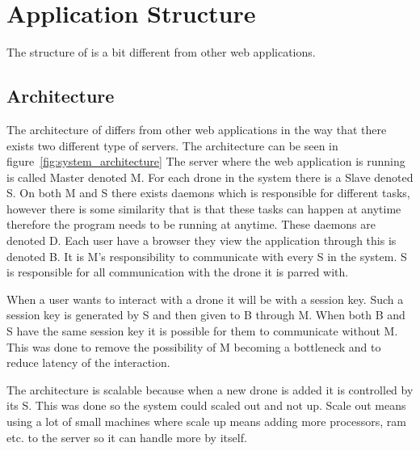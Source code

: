 \section{Application Structure}

The structure of \projectname{} is a bit different from other web applications.

\subsection{Architecture}

The architecture of \projectname{} differs from other web applications in the way that there exists two different type of servers. 
The architecture can be seen in figure~\ref{fig:system_architecture}
The server where the web application is running is called Master denoted M.
For each drone in the system there is a Slave denoted S. 
On both M and S there exists daemons which is responsible for different tasks, however there is some similarity that is that these tasks can happen at anytime therefore the program needs to be running at anytime. These daemons are denoted D.
Each user have a browser they view the application through this is denoted B.
It is M's responsibility to communicate with every S in the system.
S is responsible for all communication with the drone it is parred with.

When a user wants to interact with a drone it will be with a session key. Such a session key is generated by S and then given to B through M. When both B and S have the same session key it is possible for them to communicate without M. This was done to remove the possibility of M becoming a bottleneck and to reduce latency of the interaction.

The architecture is scalable because when a new drone is added it is controlled by its S. This was done so the system could scaled out and not up. Scale out means using a lot of small machines where scale up means adding more processors, ram etc. to the server so it can handle more by itself.

